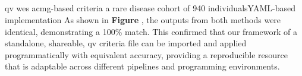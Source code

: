 \subsection{}
\DIFaddend \ac{qv} \DIFdelbegin {}\DIFdelend \DIFaddbegin {}\ac{wes} \DIFaddend \ac{acmg}-based criteria \DIFdelbegin {}\DIFdelend \DIFaddbegin {}\DIFaddend a rare disease cohort of 940 individuals\DIFdelbegin {}\DIFdelend \DIFaddbegin {}\DIFaddend YAML-based implementation \DIFaddbegin {}\DIFaddend As shown in \textbf{Figure \DIFdelbegin {}\DIFdelend \DIFaddbegin \DIFadd{\ref{fig:guru_singlecase_validation_of_yaml_vs_manual}}\DIFaddend }, 
the outputs from both methods were identical, demonstrating a 100\% match. This confirmed that our framework of a standalone, shareable, \ac{qv} criteria file can be imported and applied programmatically with equivalent accuracy, providing a reproducible resource that is adaptable across different pipelines and programming environments.

